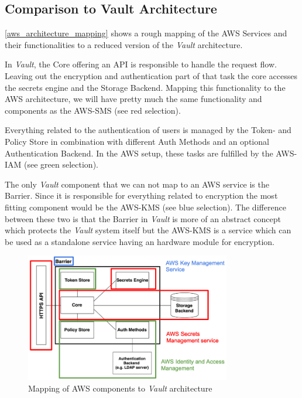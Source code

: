 \documentclass[runningheads]{llncs}
\begin{document}
\subsection{Comparison to Vault Architecture}

\autoref{aws_architecture_mapping} shows a rough mapping of the AWS Services and their functionalities to a reduced version of the \textit{Vault} architecture.

In \textit{Vault}, the Core offering an API is responsible to handle the request flow. Leaving out the encryption and authentication part of that task the core accesses the secrets engine and the Storage Backend. Mapping this functionality to the AWS architecture, we will have pretty much the same functionality and components as the AWS-SMS (see red selection).

Everything related to the authentication of users is managed by the Token- and Policy Store in combination with different Auth Methods and an optional Authentication Backend. In the AWS setup, these tasks are fulfilled by the AWS-IAM (see green selection).

The only \textit{Vault} component that we can not map to an AWS service is the Barrier. Since it is responsible for everything related to encryption the most fitting component would be the AWS-KMS (see blue selection). The difference between these two is that the Barrier in \textit{Vault} is more of an abstract concept which protects the \textit{Vault} system itself but the AWS-KMS is a service which can be used as a standalone service having an hardware module for encryption.

\begin{figure}
    \centering
    \includegraphics[width=0.8\textwidth]{images/aws_mapping.png}
    \caption{Mapping of AWS components to \textit{Vault} architecture}
    \label{aws_architecture_mapping}
\end{figure}
\end{document}

